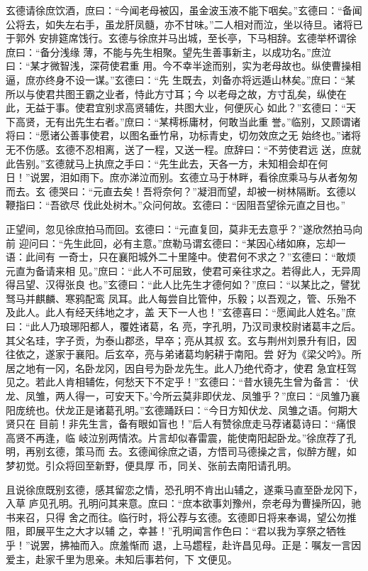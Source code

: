 玄德请徐庶饮酒，庶曰：“今闻老母被囚，虽金波玉液不能下咽矣。”玄德曰：“备闻
公将去，如失左右手，虽龙肝凤髓，亦不甘味。”二人相对而泣，坐以待旦。诸将已于郭外
安排筵席饯行。玄德与徐庶并马出城，至长亭，下马相辞。玄德举杯谓徐庶曰：“备分浅缘
薄，不能与先生相聚。望先生善事新主，以成功名。”庶泣曰：“某才微智浅，深荷使君重
用。今不幸半途而别，实为老母故也。纵使曹操相逼，庶亦终身不设一谋。”玄德曰：“先
生既去，刘备亦将远遁山林矣。”庶曰：“某所以与使君共图王霸之业者，恃此方寸耳；今
以老母之故，方寸乱矣，纵使在此，无益于事。使君宜别求高贤辅佐，共图大业，何便灰心
如此？”玄德曰：“天下高贤，无有出先生右者。”庶曰：“某樗栎庸材，何敢当此重
誉。”临别，又顾谓诸将曰：“愿诸公善事使君，以图名垂竹帛，功标青史，切勿效庶之无
始终也。”诸将无不伤感。玄德不忍相离，送了一程，又送一程。庶辞曰：“不劳使君远
送，庶就此告别。”玄德就马上执庶之手曰：“先生此去，天各一方，未知相会却在何
日！”说罢，泪如雨下。庶亦涕泣而别。玄德立马于林畔，看徐庶乘马与从者匆匆而去。玄
德哭曰：“元直去矣！吾将奈何？”凝泪而望，却被一树林隔断。玄德以鞭指曰：“吾欲尽
伐此处树木。”众问何故。玄德曰：“因阻吾望徐元直之目也。”

正望间，忽见徐庶拍马而回。玄德曰：“元直复回，莫非无去意乎？”遂欣然拍马向前
迎问曰：“先生此回，必有主意。”庶勒马谓玄德曰：“某因心绪如麻，忘却一语：此间有
一奇士，只在襄阳城外二十里隆中。使君何不求之？”玄德曰：“敢烦元直为备请来相
见。”庶曰：“此人不可屈致，使君可亲往求之。若得此人，无异周得吕望、汉得张良
也。”玄德曰：“此人比先生才德何如？”庶曰：“以某比之，譬犹驽马并麒麟、寒鸦配鸾
凤耳。此人每尝自比管仲，乐毅；以吾观之，管、乐殆不及此人。此人有经天纬地之才，盖
天下一人也！”玄德喜曰：“愿闻此人姓名。”庶曰：“此人乃琅琊阳都人，覆姓诸葛，名
亮，字孔明，乃汉司隶校尉诸葛丰之后。其父名珪，字子贡，为泰山郡丞，早卒；亮从其叔
玄。玄与荆州刘景升有旧，因往依之，遂家于襄阳。后玄卒，亮与弟诸葛均躬耕于南阳。尝
好为《梁父吟》。所居之地有一冈，名卧龙冈，因自号为卧龙先生。此人乃绝代奇才，使君
急宜枉驾见之。若此人肯相辅佐，何愁天下不定乎！”玄德曰：“昔水镜先生曾为备言：
‘伏龙、凤雏，两人得一，可安天下。’今所云莫非即伏龙、凤雏乎？”庶曰：“凤雏乃襄
阳庞统也。伏龙正是诸葛孔明。”玄德踊跃曰：“今日方知伏龙、凤雏之语。何期大贤只在
目前！非先生言，备有眼如盲也！”后人有赞徐庶走马荐诸葛诗曰：“痛恨高贤不再逢，临
岐泣别两情浓。片言却似春雷震，能使南阳起卧龙。”徐庶荐了孔明，再别玄德，策马而
去。玄德闻徐庶之语，方悟司马德操之言，似醉方醒，如梦初觉。引众将回至新野，便具厚
币，同关、张前去南阳请孔明。

且说徐庶既别玄德，感其留恋之情，恐孔明不肯出山辅之，遂乘马直至卧龙冈下，入草
庐见孔明。孔明问其来意。庶曰：“庶本欲事刘豫州，奈老母为曹操所囚，驰书来召，只得
舍之而往。临行时，将公荐与玄德。玄德即日将来奉谒，望公勿推阻，即展平生之大才以辅
之，幸甚！”孔明闻言作色曰：“君以我为享祭之牺牲乎！”说罢，拂袖而入。庶羞惭而
退，上马趱程，赴许昌见母。正是：嘱友一言因爱主，赴家千里为思亲。未知后事若何，下
文便见。